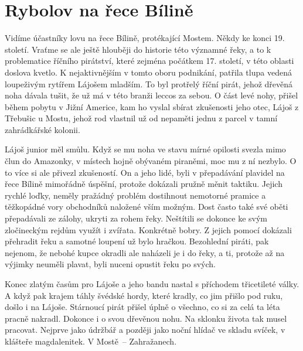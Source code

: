 
\chapter{Rybolov na řece Bílině}

Vidíme účastníky lovu na řece Bílině, protékající Mostem. Někdy ke konci 19.
století. Vraťme se ale ještě hlouběji do historie této významné řeky, a to k
problematice říčního pirátství, které zejména počátkem 17. století, v této
oblasti doslova kvetlo. K nejaktivnějším v tomto oboru podnikání, patřila tlupa
vedená loupeživým rytířem Lájošem mladším. To byl protřelý říční pirát, jehož
dřevěná noha dávala tušit, že už má v této branži leccos za sebou. O část levé
nohy, přišel během pobytu v Jižní Americe, kam ho vyslal sbírat zkušenosti jeho
otec, Lájoš z Třebušic u Mostu, jehož rod vlastnil už od nepaměti jednu z
parcel v tamní zahrádkářské kolonii.

Lájoš junior měl smůlu. Když se mu noha ve stavu mírné opilosti svezla mimo
člun do Amazonky, v místech hojně obývaném piraněmi, moc mu z ní nezbylo. O to
více si ale přivezl zkušeností. On a jeho lidé, byli v přepadávání plavidel na
řece Bílině mimořádně úspěšní, protože dokázali pružně měnit taktiku. Jejich
rychlé loďky, neměly pražádný problém dostihnout nemotorné pramice a těžkopádné
vory obchodníků naložené vším možným. Dost často také své oběti přepadávali ze
zálohy, ukryti za rohem řeky. Neštítili se dokonce ke svým zločineckým rejdům
využít i zvířata. Konkrétně bobry. Z jejich pomocí dokázali přehradit řeku a
samotné loupení už bylo hračkou. Bezohlední piráti, pak nejenom, že nebohé
kupce okradli ale naházeli je i do řeky, a ti, protože až na výjimky neuměli
plavat, byli nuceni opustit řeku po svých.

Konec zlatým časům pro Lájoše a jeho bandu nastal s příchodem třicetileté
války. A když pak krajem táhly švédské hordy, které kradly, co jim přišlo pod
ruku, došlo i na Lájoše. Stárnoucí pirát přišel úplně o všechno, co si za celá
ta léta pracně nakradl. Dokonce i o svou dřevěnou nohu. Na sklonku života tak
musel pracovat. Nejprve jako údržbář a později jako noční hlídač ve skladu
svíček, v klášteře magdalenitek. V Mostě~-- Zahražanech.

